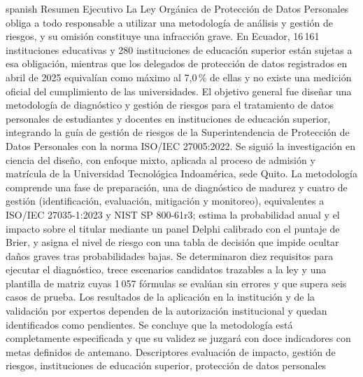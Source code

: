 \UTIResumenPagina
  {spanish}
  {Resumen Ejecutivo}
  {La Ley Orgánica de Protección de Datos Personales obliga a todo responsable a utilizar una metodología de análisis y gestión de riesgos, y su omisión constituye una infracción grave. En Ecuador, 16\,161 instituciones educativas y 280 instituciones de educación superior están sujetas a esa obligación, mientras que los delegados de protección de datos registrados en abril de 2025 equivalían como máximo al 7,0\,\% de ellas y no existe una medición oficial del cumplimiento de las universidades. El objetivo general fue diseñar una metodología de diagnóstico y gestión de riesgos para el tratamiento de datos personales de estudiantes y docentes en instituciones de educación superior, integrando la guía de gestión de riesgos de la Superintendencia de Protección de Datos Personales con la norma ISO/IEC 27005:2022. Se siguió la investigación en ciencia del diseño, con enfoque mixto, aplicada al proceso de admisión y matrícula de la Universidad Tecnológica Indoamérica, sede Quito. La metodología comprende una fase de preparación, una de diagnóstico de madurez y cuatro de gestión (identificación, evaluación, mitigación y monitoreo), equivalentes a ISO/IEC 27035-1:2023 y NIST SP 800-61r3; estima la probabilidad anual y el impacto sobre el titular mediante un panel Delphi calibrado con el puntaje de Brier, y asigna el nivel de riesgo con una tabla de decisión que impide ocultar daños graves tras probabilidades bajas. Se determinaron diez requisitos para ejecutar el diagnóstico, trece escenarios candidatos trazables a la ley y una plantilla de matriz cuyas 1\,057 fórmulas se evalúan sin errores y que supera seis casos de prueba. Los resultados de la aplicación en la institución y de la validación por expertos dependen de la autorización institucional y quedan identificados como pendientes. Se concluye que la metodología está completamente especificada y que su validez se juzgará con doce indicadores con metas definidos de antemano.}
  {Descriptores}
  {evaluación de impacto, gestión de riesgos, instituciones de educación superior, protección de datos personales}
